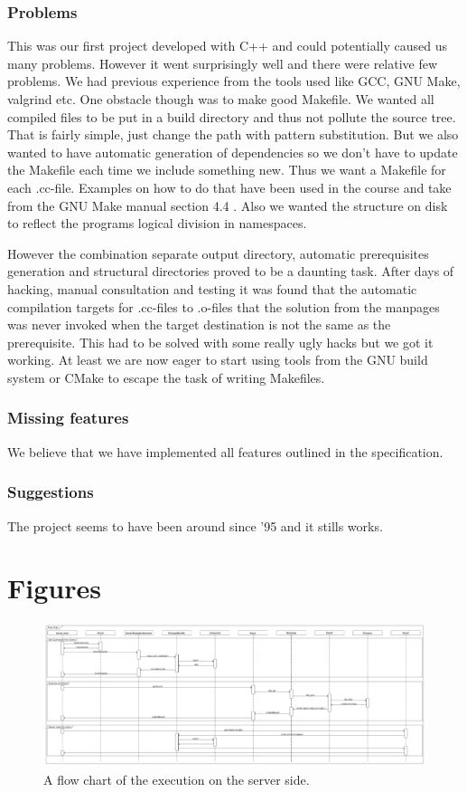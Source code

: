\documentclass[10pt, a4paper]{article}
\begin{document}
\subsubsection{Problems}
This was our first project developed with C++ and could potentially caused us many problems. However it went surprisingly well and there were relative few problems. We had previous experience from the tools used like GCC, GNU Make, valgrind etc. One obstacle though was to make good Makefile. We wanted all compiled files to be put in a build directory and thus not pollute the source tree. That is fairly simple, just change the path with pattern substitution. But we also wanted to have automatic generation of dependencies so we don't have to update the Makefile each time we include something new. Thus we want a Makefile for each .cc-file. Examples on how to do that have been used in the course and take from the GNU Make manual section 4.4 \cite{makeman}. Also we wanted the structure on disk to reflect the programs logical division in namespaces.

However the combination separate output directory, automatic prerequisites generation and structural directories proved to be a daunting task. After days of hacking, manual consultation and testing it was found that the automatic compilation targets for .cc-files to .o-files that the solution from the manpages was never invoked when the target destination is not the same as the prerequisite. This had to be solved with some really ugly hacks but we got it working. At least we are now eager to start using tools from the GNU build system or CMake to escape the task of writing Makefiles.


\subsubsection{Missing features}
We believe that we have implemented all features outlined in the specification.

\subsubsection{Suggestions}
The project seems to have been around since '95 and it stills works.

\appendix



\section{Figures}
\begin{figure}[hbt]
\begin{center}
\vspace*{-1.8in}
\includegraphics[scale=0.3,angle=90]{img/flow-chart.pdf}
\thispagestyle{empty}	%
\end{center}
\label{flow+chart}
\caption{A flow chart of the execution on the server side.}
\end{figure}
\end{document}
